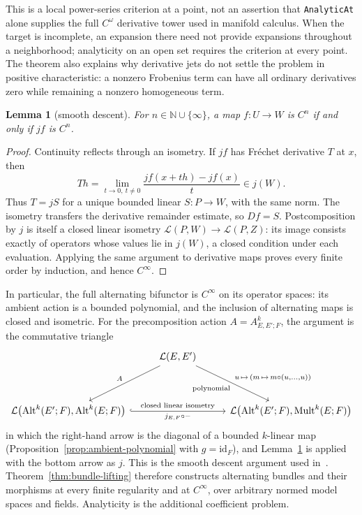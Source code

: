 \documentclass[11pt]{amsart}
\newtheorem{lemma}[theorem]{Lemma}
\theoremstyle{definition}
\theoremstyle{remark}
\numberwithin{equation}{section}
\newcommand{\cL}{\mathcal L}
\newcommand{\Alt}{\operatorname{Alt}}
\newcommand{\Mult}{\operatorname{Mult}}
\newcommand{\id}{\mathrm{id}}
\begin{document}
This is a local power-series criterion at a point, not an assertion that \texttt{AnalyticAt} alone supplies the full $C^\omega$ derivative tower used in manifold calculus. When the target is incomplete, an expansion there need not provide expansions throughout a neighborhood; analyticity on an open set requires the criterion at every point. The theorem also explains why derivative jets do not settle the problem in positive characteristic: a nonzero Frobenius term can have all ordinary derivatives zero while remaining a nonzero homogeneous term.

\begin{lemma}[smooth descent]\label{lem:closed-smooth}
For $n\in\mathbb N\cup\{\infty\}$, a map $f\colon U\to W$ is $C^n$ if and only if $jf$ is $C^n$.
\end{lemma}
\begin{proof}
Continuity reflects through an isometry. If $jf$ has Fr\'echet derivative $T$ at $x$, then
\[
 Th=\lim_{t\to0,\ t\ne0}\frac{jf(x+th)-jf(x)}t\in j(W).
\]
Thus $T=jS$ for a unique bounded linear $S\colon P\to W$, with the same norm. The isometry transfers the derivative remainder estimate, so $Df=S$. Postcomposition by $j$ is itself a closed linear isometry
$\cL(P,W)\to\cL(P,Z)$: its image consists exactly of operators whose values lie in $j(W)$, a closed condition under each evaluation. Applying the same argument to derivative maps proves every finite order by induction, and hence $C^\infty$.
\end{proof}

In particular, the full alternating bifunctor is $C^\infty$ on its operator spaces: its ambient action is a bounded polynomial, and the inclusion of alternating maps is closed and isometric. For the precomposition action $A=A^k_{E,E';F}$, the argument is the commutative triangle
\[
\begin{tikzcd}[column sep=2.6em,row sep=3.6em]
& \cL(E,E') \arrow[dl,"A"'] \arrow[dr,"{u\,\mapsto\,(m\,\mapsto\,m\circ(u,\ldots,u))}","\text{polynomial}"'] & \\
\cL\bigl(\Alt^k(E';F),\Alt^k(E;F)\bigr) \arrow[rr,hook,"\text{closed linear isometry}","{j_{E,F}\circ{-}}"'] & &
\cL\bigl(\Alt^k(E';F),\Mult^k(E;F)\bigr)
\end{tikzcd}
\]
in which the right-hand arrow is the diagonal of a bounded $k$-linear map (Proposition~\ref{prop:ambient-polynomial} with $g=\id_F$), and Lemma~\ref{lem:closed-smooth} is applied with the bottom arrow as $j$. This is the smooth descent argument used in~\cite{PR}. Theorem~\ref{thm:bundle-lifting} therefore constructs alternating bundles and their morphisms at every finite regularity and at $C^\infty$, over arbitrary normed model spaces and fields. Analyticity is the additional coefficient problem.
\end{document}
